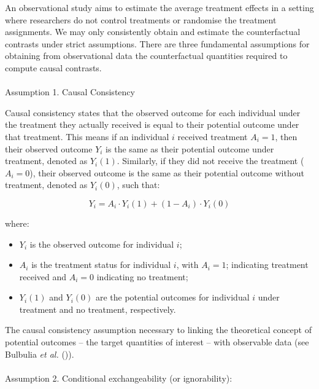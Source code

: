 \documentclass[
  single column]{article}
\makeatletter
\let\oldparagraph\paragraph
\renewcommand{\paragraph}{
    \@ifstar
      \xxxParagraphStar
      \xxxParagraphNoStar
  }
\newcommand{\xxxParagraphStar}[1]{\oldparagraph*{#1}\mbox{}}
\newcommand{\xxxParagraphNoStar}[1]{\oldparagraph{#1}\mbox{}}
\providecommand{\tightlist}{%
  \setlength{\itemsep}{0pt}\setlength{\parskip}{0pt}}\usepackage{longtable,booktabs,array}
\makeatother
\begin{document}
An observational study aims to estimate the average treatment effects in
a setting where researchers do not control treatments or randomise the
treatment assignments. We may only consistently obtain and estimate the
counterfactual contrasts under strict assumptions. There are three
fundamental assumptions for obtaining from observational data the
counterfactual quantities required to compute causal contrasts.

\paragraph{Assumption 1. Causal
Consistency}\label{assumption-1.-causal-consistency}

Causal consistency states that the observed outcome for each individual
under the treatment they actually received is equal to their potential
outcome under that treatment. This means if an individual \(i\) received
treatment \(A_i = 1\), then their observed outcome \(Y_i\) is the same
as their potential outcome under treatment, denoted as \(Y_i(1)\).
Similarly, if they did not receive the treatment (\(A_i = 0\)), their
observed outcome is the same as their potential outcome without
treatment, denoted as \(Y_i(0)\), such that:

\[
Y_i = A_i \cdot Y_i(1) + (1 - A_i) \cdot Y_i(0)
\]

where:

\begin{itemize}
\tightlist
\item
  \(Y_i\) is the observed outcome for individual \(i\);
\item
  \(A_i\) is the treatment status for individual \(i\), with
  \(A_i = 1\); indicating treatment received and \(A_i = 0\) indicating
  no treatment;
\item
  \(Y_i(1)\) and \(Y_i(0)\) are the potential outcomes for individual
  \(i\) under treatment and no treatment, respectively.
\end{itemize}

The causal consistency assumption necessary to linking the theoretical
concept of potential outcomes -- the target quantities of interest --
with observable data (see Bulbulia \emph{et al.}
()).

\paragraph{Assumption 2. Conditional exchangeability (or
ignorability):}\label{assumption-2.-conditional-exchangeability-or-ignorability}
\end{document}
